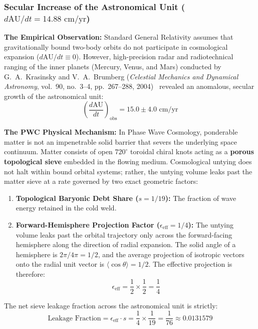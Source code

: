 \documentclass[11pt,a4paper]{article}
\begin{document}
\subsubsection{Secular Increase of the Astronomical Unit (\texorpdfstring{$d\text{AU}/dt = 14.88\text{ cm/yr}$}{dAU/dt = 14.88 cm/yr})}
\label{subsubsec:secular_au_drift}

\textbf{The Empirical Observation:}  
Standard General Relativity assumes that gravitationally bound two-body orbits do not participate in cosmological expansion ($d\text{AU}/dt \equiv 0$). However, high-precision radar and radiotechnical ranging of the inner planets (Mercury, Venus, and Mars) conducted by G.~A.~Krasinsky and V.~A.~Brumberg (\textit{Celestial Mechanics and Dynamical Astronomy}, vol.~90, no.~3--4, pp.~267--288, 2004)~\cite{Krasinsky2004} revealed an anomalous, secular growth of the astronomical unit:
\begin{equation}
\left(\frac{d\text{AU}}{dt}\right)_{\text{obs}} = 15.0 \pm 4.0\text{ cm/yr}
\end{equation}

\textbf{The PWC Physical Mechanism:}  
In Phase Wave Cosmology, ponderable matter is not an impenetrable solid barrier that severs the underlying space continuum. Matter consists of open $720^\circ$ toroidal chiral knots acting as a \textbf{porous topological sieve} embedded in the flowing medium. Cosmological untying does not halt within bound orbital systems; rather, the untying volume leaks past the matter sieve at a rate governed by two exact geometric factors:
\begin{enumerate}
    \item \textbf{Topological Baryonic Debt Share ($s = 1/19$):} The fraction of wave energy retained in the cold weld.
    \item \textbf{Forward-Hemisphere Projection Factor ($\epsilon_{\text{eff}} = 1/4$):} The untying volume leaks past the orbital trajectory only across the forward-facing hemisphere along the direction of radial expansion. The solid angle of a hemisphere is $2\pi/4\pi = 1/2$, and the average projection of isotropic vectors onto the radial unit vector is $\langle\cos\theta\rangle = 1/2$. The effective projection is therefore:
    \begin{equation}
    \epsilon_{\text{eff}} = \frac{1}{2} \times \frac{1}{2} = \frac{1}{4}
    \end{equation}
\end{enumerate}

The net sieve leakage fraction across the astronomical unit is strictly:
\begin{equation}
\text{Leakage Fraction} = \epsilon_{\text{eff}} \cdot s = \frac{1}{4} \times \frac{1}{19} = \frac{1}{76} \approx 0.0131579
\end{equation}
\end{document}
